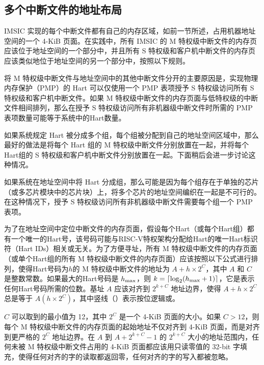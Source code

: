 \begin{translation}
\subsection{多个中断文件的地址布局}

IMSIC 实现的每个中断文件都有自己的内存区域，如前一节所述，占用机器地址空间的一个 \mbox{4-KiB} 页面。在实践中，所有 IMSIC 的 M 特权级中断文件的内存页应该位于地址空间的一个部分中，并且所有 S 特权级和客户机中断文件的内存页应该类似地位于地址空间的另一个部分中，按照以下规则。

\begin{commentary}
    将 M 特权级中断文件与地址空间中的其他中断文件分开的主要原因是，实现物理内存保护（PMP）的 Hart 可以仅使用一个 PMP 表项授予 S 特权级访问所有 S 特权级和客户机中断文件。如果 M 特权级中断文件的内存页面与低特权级的中断文件相间排列，那么在授予 S 特权级访问所有非机器级中断文件时所需的 PMP 表项数量可能等于系统中的Hart数量。
\end{commentary}

如果系统规定 Hart 被分成多个组，每个组被分配到自己的地址空间区域中，那么最好的做法是将每个 Hart 组的 M 特权级中断文件分别放置在一起，并将每个Hart组的 S 特权级和客户机中断文件分别放置在一起。下面稍后会进一步讨论这种情况。

\begin{commentary}
    如果系统在地址空间中将 Hart 分成组，那么可能是因为每个组存在于单独的芯片（或多芯片模块中的芯片块）上，将多个芯片的地址空间编织在一起是不可行的。在这种情况下，授予 S 特权级访问所有非机器级中断文件需要每个组一个 PMP 表项。
\end{commentary}

为了在地址空间中定位中断文件的内存页面，假设每个Hart（或每个Hart组）都有一个唯一的Hart号，该号码可能与RISC-V特权架构分配给Hart的唯一Hart标识符（Hart IDs）相关或无关。为了方便寻址，所有 M 特权级中断文件的内存页面（或单个Hart组的所有 M 特权级中断文件的内存页面）应该按照以下公式进行排列，使得Hart号码为$h$的 M 特权级中断文件的地址为 ${A+h\times\mbox{2}^{C}}$，其中 $A$ 和 $C$ 是整数常数。如果最大的Hart号码是 $h_{\rm max}$，则 ${k = \lceil\log_{2}(h_{\rm max}+\mbox{1})\rceil}$，它是表示任何Hart号码所需的位数。基址 $A$ 应该对齐到 $\mbox{2}^{k+C}$ 地址边界，使得 ${A+h\times\mbox{2}^{C}}$ 总是等于 $A$\z{|}${(h\times\mbox{2}^{C})}$，其中竖线（\z{|}）表示按位逻辑或。

$C$ 可以取到的最小值为 12，其中 $\mbox{2}^{C}$ 是一个 \mbox{4-KiB} 页面的大小。如果 ${C > 12}$，则每个 M 特权级中断文件的内存页面的起始地址不仅对齐到 \mbox{4-KiB} 页面，而是对齐到更严格的 $\mbox{2}^{C}$ 地址边界。在 $A$ 到 ${A+\mbox{2}^{k+C}-\mbox{1}}$ 的 ${\mbox{2}^{k+C}}$ 大小的地址范围内，任何未被 M 特权级中断文件占用的 \mbox{4-KiB} 页面都应该用只读零值的 \mbox{32-bit} 字填充，使得任何对齐的字的读取都返回零，任何对齐的字的写入都被忽略。


\end{translation}
